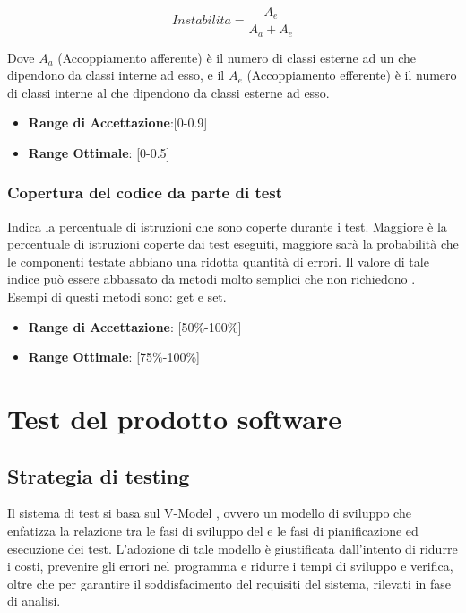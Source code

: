 \documentclass[12pt,a4paper]{article}
\begin{document}
\[Instabilita=\frac{A_e}{A_a+A_e}\]

Dove $A_a$ (Accoppiamento afferente) è il numero di classi esterne ad un  che dipendono da classi interne ad esso, e il $A_e$ (Accoppiamento efferente) è il numero di classi interne al  che dipendono da classi esterne ad esso.

\begin{itemize}
\item \textbf{Range di Accettazione}:[0-0.9]
\item \textbf{Range Ottimale}: [0-0.5]
\end{itemize}

\subsubsection{Copertura del codice da parte di test}
Indica la percentuale di istruzioni che sono coperte durante i test. Maggiore è la percentuale di istruzioni coperte dai test eseguiti, maggiore sarà la probabilità che le componenti testate abbiano una ridotta quantità di errori. Il valore di tale indice può essere abbassato da metodi molto semplici che non richiedono . Esempi di questi metodi sono: get e set.

\begin{itemize}
\item \textbf{Range di Accettazione}: [50\%-100\%]
\item \textbf{Range Ottimale}: [75\%-100\%]
\end{itemize}

\newpage

\section{Test del prodotto software}\label{test}

\subsection{Strategia di testing}\label{test_strategia}
Il sistema di test si basa sul V-Model , ovvero un modello di sviluppo che enfatizza la relazione tra le fasi di sviluppo del  e le fasi di pianificazione ed esecuzione dei test. L'adozione di tale modello è giustificata dall'intento di ridurre i costi, prevenire gli errori nel programma e ridurre i tempi di sviluppo e verifica, oltre che per garantire il soddisfacimento del requisiti del sistema, rilevati in fase di analisi.
\end{document}
